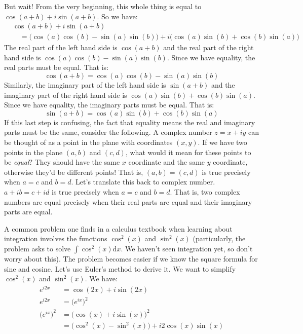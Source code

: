 \documentclass{article}
\theoremstyle{normal}
\theoremstyle{plain}
\begin{document}
    But wait! From the very beginning, this whole thing is equal to
    $\cos(a+b)+i\sin(a+b)$. So we have:
    \begin{align}
        &\cos(a+b)+i\sin(a+b)\nonumber\\
        &\quad=\big(\cos(a)\cos(b)-\sin(a)\sin(b)\big)+
            i\big(\cos(a)\sin(b)+\cos(b)\sin(a)\big)
    \end{align}
    The real part of the left hand side is $\cos(a+b)$ and the real part of
    the right hand side is $\cos(a)\cos(b)-\sin(a)\sin(b)$. Since we have
    equality, the real parts must be equal. That is:
    \begin{equation}
        \cos(a+b)=\cos(a)\cos(b)-\sin(a)\sin(b)
    \end{equation}
    Similarly, the imaginary part of the left hand side is $\sin(a+b)$ and the
    imaginary part of the right hand side is
    $\cos(a)\sin(b)+\cos(b)\sin(a)$. Since we have equality, the imaginary
    parts must be equal. That is:
    \begin{equation}
        \sin(a+b)=\cos(a)\sin(b)+\cos(b)\sin(a)
    \end{equation}
    If this last step is confusing, the fact that equality means the real and
    imaginary parts must be the same, consider the following. A complex number
    $z=x+iy$ can be thought of as a point in the plane with coordinates
    $(x,y)$. If we have two points in the plane $(a,b)$ and $(c,d)$, what would
    it mean for these points to be \textit{equal}? They should have the same
    $x$ coordinate and the same $y$ coordinate, otherwise they'd be different
    points! That is, $(a,b)=(c,d)$ is true precisely when $a=c$ and $b=d$.
    Let's translate this back to complex number. $a+ib=c+id$ is true precisely
    when $a=c$ and $b=d$. That is, two complex numbers are equal precisely when
    their real parts are equal and their imaginary parts are equal.
    \par\hfill\par
    A common problem one finds in a calculus textbook when learning about
    integration involves the functions $\cos^{2}(x)$ and $\sin^{2}(x)$
    (particularly, the problem asks to solve $\int\cos^{2}(x)\textrm{d}x$. We
    haven't seen integration yet, so don't worry about this). The problem
    becomes easier if we know the square formula for sine and cosine. Let's
    use Euler's method to derive it. We want to simplify $\cos^{2}(x)$ and
    $\sin^{2}(x)$. We have:
    \begin{align}
        e^{i2x}&=\cos(2x)+i\sin(2x)\tag{Euler's Formula}\\
        e^{i2x}&=\big(e^{ix}\big)^{2}\tag{Exponential Property}\\
        \big(e^{ix}\big)^{2}&=\big(\cos(x)+i\sin(x)\big)^{2}
            \tag{Euler's Formula}\\
            &=\big(\cos^{2}(x)-\sin^{2}(x)\big)+i2\cos(x)\sin(x)
    \end{align}
\end{document}

